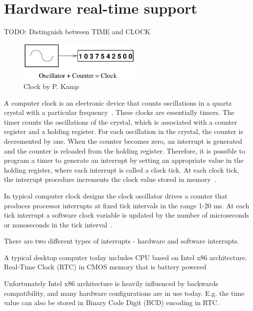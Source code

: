 
\chapter{Hardware real-time support}
TODO: Distinguish between TIME and CLOCK

\begin{figure}
	\centering
	\includegraphics[width=6cm,keepaspectratio]{fig/clock.png}
	\caption{Clock by P. Kamp}
	\label{fig:hw-clock}
\end{figure}

A computer clock is an electronic device that counts oscillations in a
quartz crystal with a particular frequency~\cite{thesis-sync}.
These clocks are essentially timers.
The timer counts the oscillations of the crystal, which is associated with
a counter register and a holding register.
For each oscillation in the crystal, the counter is decremented by one.
When the counter becomes zero, an interrupt is generated and the
counter is reloaded from the holding register.
Therefore, it is possible to
program a timer to generate an interrupt by setting an appropriate value in
the holding register, where each interrupt is called a clock tick.
At each clock tick,
the interrupt procedure increments the clock value stored in memory~\cite{thesis-sync}.

In typical computer clock designs the clock oscillator drives a counter that produces processor interrupts at
fixed tick intervals in the range 1-20 ms.
At each tick interrupt a software clock variable is updated by the
number of microseconds or nanoseconds in the tick interval~\cite{timecounters}.


There are two different types of interrupts - hardware and software interrupts.

A typical desktop computer today includes CPU based on Intel x86 architecture.
Real-Time Clock (RTC) in CMOS memory that is battery powered

Unfortunately Intel x86 architecture is heavily influenced by backwards compatibility,
and many hardware configurations are in use today.
E.g. the time value can also be stored in Binary Code Digit (BCD) encoding in RTC.

